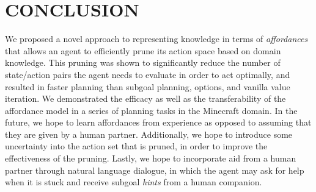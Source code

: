 \documentclass[]{article}
\begin{document}

\section{CONCLUSION}

We proposed a novel approach to representing
knowledge in terms of {\em
  affordances}~\citep{gibson77} that allows an agent to efficiently prune its
action space based on domain knowledge. This pruning was shown to significantly
reduce the number of state/action pairs the agent needs to evaluate
in order to act optimally, and resulted in faster planning than subgoal planning, options,
and vanilla value iteration. We demonstrated the efficacy as well as the 
transferability of the affordance model in a series of planning tasks in the Minecraft domain.
In the future, we hope to learn affordances from experience as opposed to assuming
that they are given by a human partner. Additionally, we hope to introduce some uncertainty
into the action set that is pruned, in order to improve the effectiveness of the pruning. Lastly,
we hope to incorporate aid from a human partner through natural language dialogue, in which
the agent may ask for help when it is stuck and receive subgoal {\it hints} from a human
companion.


  
\end{document}
